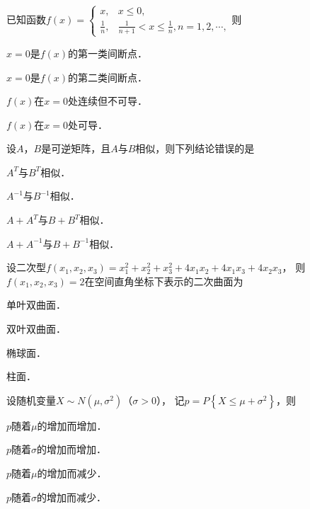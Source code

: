 \documentclass[plain,noanswer,medmath]{../../template/jnuexam}
\begin{document}
\begin{problem}
已知函数$f(x) = \begin{cases}
            x, & x \le 0, \\
  \frac{1}{n}, & \frac{1}{n + 1} < x \le \frac{1}{n},n = 1,2, \cdots ,
\end{cases}$则\pickout{}
\begin{abcd}
\item $x = 0$是$f(x)$的第一类间断点．
\item $x = 0$是$f(x)$的第二类间断点．
\item $f(x)$在$x = 0$处连续但不可导．
\item $f(x)$在$x = 0$处可导．
\end{abcd}
\end{problem}


\begin{problem}
设$A$，$B$是可逆矩阵，且$A$与$B$相似，则下列结论错误的是\pickout{}
\begin{abcd}
\item $A^T$与$B^T$相似．
\item $A^{-1}$与$B^{-1}$相似．
\item $A + A^T$与$B + B^T$相似．
\item $A + A^{-1}$与$B + B^{-1}$相似．
\end{abcd}
\end{problem}


\begin{problem}
设二次型$f\left(x_1,x_2,x_3 \right) = x_1^2 + x_2^2 + x_3^2 + 4x_1x_2 + 4x_1x_3 + 4x_2x_3$，
则$f\left(x_1,x_2,x_3 \right) = 2$在空间直角坐标下表示的二次曲面为\pickout{}
\begin{abcd}
\item 单叶双曲面．
\item 双叶双曲面．
\item 椭球面．
\item 柱面．
\end{abcd}
\end{problem}


\begin{problem}
设随机变量$X\sim N\left(\mu ,\sigma^2 \right)$（$\sigma > 0$），
记$p = P\left\{X \le \mu + \sigma^2 \right\}$，则\pickout{}
\begin{abcd}
\item $p$随着$\mu$的增加而增加．
\item $p$随着$\sigma$的增加而增加．
\item $p$随着$\mu$的增加而减少．
\item $p$随着$\sigma$的增加而减少．
\end{abcd}
\end{problem}
\end{document}
